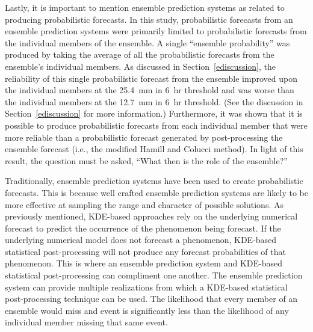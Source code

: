 Lastly, it is important to mention ensemble prediction systems as related to producing probabilistic forecasts.
In this study, probabilistic forecasts from an ensemble prediction systems were primarily limited to probabilistic forecasts from the individual members of the ensemble.
A single ``ensemble probability'' was produced by taking the average of all the probabilistic forecasts from the ensemble's individual members.
As discussed in \mbox{Section \ref{ediscussion}}, the reliability of this single probabilistic forecast from the ensemble improved upon the individual members at the \mbox{25.4 mm} in \mbox{6 hr} threshold and was worse than the individual members at the \mbox{12.7 mm} in \mbox{6 hr} threshold.
(See the discussion in \mbox{Section \ref{ediscussion}} for more information.)
Furthermore, it was shown that it is possible to produce probabilistic forecasts from each individual member that were more reliable than a probabilistic forecast generated by post-processing the ensemble forecast (i.e., the modified Hamill and Colucci method).
In light of this result, the question must be asked, ``What then is the role of the ensemble?''


Traditionally, ensemble prediction systems have been used to create probabilistic forecasts.
This is because well crafted ensemble prediction systems are likely to be more effective at sampling the range and character of possible solutions.
As previously mentioned, KDE-based approaches rely on the underlying numerical forecast to predict the occurrence of the phenomenon being forecast.
If the underlying numerical model does not forecast a phenomenon, KDE-based statistical post-processing will not produce any forecast probabilities of that phenomenon.
This is where an ensemble prediction system and KDE-based statistical post-processing can compliment one another.
The ensemble prediction system can provide multiple realizations from which a KDE-based statistical post-processing technique can be used.
The likelihood that every member of an ensemble would miss and event is significantly less than the likelihood of any individual member missing that same event.


